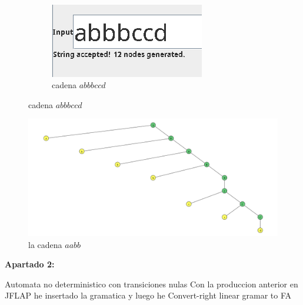 \documentclass{article}
\begin{document}
\begin{figure}[!h]
                \vspace{0.5cm} 
                \\
                \begin{subfigure}[b]{0.25\textwidth}
                    \centering
                    \includegraphics[width=\textwidth]{./Imagenes/image7.png}
                    \caption{cadena $abbbccd$}
                    \label{fig:label3}
                \end{subfigure}
                \label{fig:matrix1}
            \end{figure}


        \newpage


        \begin{figure}[!h]
            \centering
            \includegraphics[width=\textwidth]{./Imagenes/image6.png}
            \caption{la cadena $aabb$}
            \label{fig:label4}
        \end{figure}
        \vspace{\baselineskip} %
        \textbf{Apartado 2:}

        Automata no deterministico con transiciones nulas
        Con la produccion anterior en JFLAP he insertado la gramatica y luego he Convert-right linear gramar to FA
        \vspace{\baselineskip} %
\end{document}
